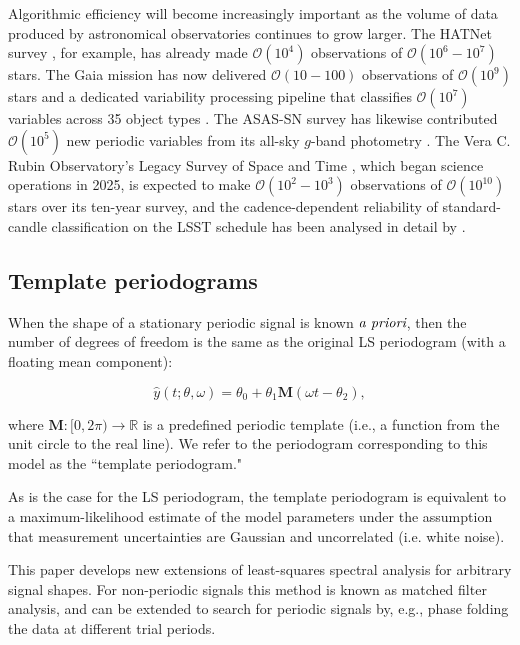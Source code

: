 \documentclass[apj]{emulateapj}
\newcommand{\bigO}{\mathcal{O}}
\begin{document}
Algorithmic efficiency will become increasingly important as the volume
of data produced by astronomical observatories continues to grow larger. The HATNet survey
\citep{HATNet}, for example, has already made $\bigO(10^4)$ observations of
$\bigO(10^6-10^7)$ stars. The Gaia mission \citep{GAIA} has now delivered $\bigO(10-100)$
observations of $\bigO(10^9)$ stars and a dedicated variability processing pipeline that classifies $\bigO(10^7)$ variables across 35 object types \citep{Eyer_etal_2023}. The ASAS-SN survey has likewise contributed $\bigO(10^5)$ new periodic variables from its all-sky $g$-band photometry \citep{Christy_etal_2023}.
The Vera C. Rubin Observatory's Legacy Survey of Space and Time \citep[LSST;][]{LSST}, which began science operations in 2025,
is expected to make $\bigO(10^2-10^3)$ observations of $\bigO(10^{10})$ stars over its ten-year survey, and the cadence-dependent reliability of standard-candle classification on the LSST schedule has been analysed in detail by \citet{Hernitschek+Stassun_2021}.


\subsection{Template periodograms}

When the shape of a stationary periodic signal is known $\emph{a priori}$, then the number of degrees of freedom is the same as the original LS periodogram (with a floating mean component):

\begin{equation}
    \hat{y}(t;\theta, \omega) = \theta_0 + \theta_1 \mathbf{M}(\omega t - \theta_2),
\end{equation}

where $\mathbf{M}:[0, 2\pi)\rightarrow \mathbb{R}$ is a predefined periodic template (i.e., a function from the unit circle to the real line).
We refer to the periodogram corresponding to this model as the ``template periodogram."

As is the case for the LS periodogram, the template periodogram
is equivalent to a maximum-likelihood estimate of the model parameters under the assumption that
measurement uncertainties are Gaussian and uncorrelated (i.e. white noise).

This paper develops new extensions of least-squares spectral analysis for arbitrary
signal shapes. For non-periodic signals this method is known as matched filter analysis,
and can be extended to search for periodic signals by, e.g., phase folding the data
at different trial periods.
\end{document}
